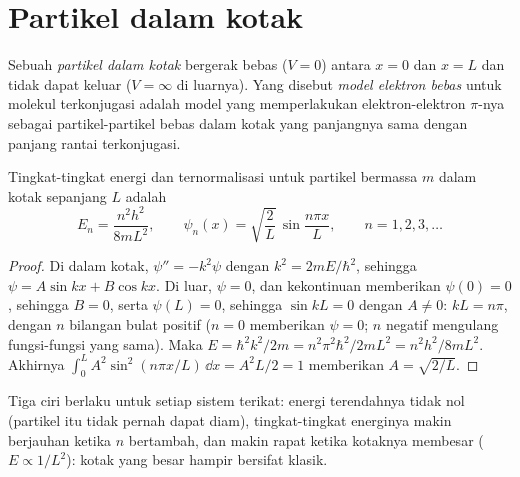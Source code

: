 \section{Partikel dalam kotak}

\begin{definition}\label{def:b3:quantum-model-systems:box}
Sebuah \emph{partikel dalam kotak} bergerak
bebas ($V = 0$) antara $x = 0$ dan $x = L$ dan tidak dapat keluar
($V = \infty$ di luarnya). Yang disebut \emph{model elektron
bebas} untuk molekul terkonjugasi adalah model
yang memperlakukan elektron-elektron $\pi$-nya sebagai partikel-partikel
bebas dalam kotak yang panjangnya sama dengan panjang rantai terkonjugasi.
\end{definition}

\begin{theorem}\label{thm:b3:quantum-model-systems:box}
Tingkat-tingkat energi dan  ternormalisasi untuk
partikel bermassa $m$ dalam kotak sepanjang $L$ adalah
\[
E_n = \frac{n^2h^2}{8mL^2}, \qquad \psi_n(x) = \sqrt{\frac2L}\,\sin\frac{n\pi
x}{L}, \qquad n = 1, 2, 3, \dots
\]
\end{theorem}

\begin{proof}
Di dalam kotak, $\psi'' = -k^2\psi$ dengan $k^2 = 2mE/\hbar^2$, sehingga
$\psi = A\sin kx +
B\cos kx$. Di luar, $\psi = 0$, dan kekontinuan memberikan
$\psi(0) = 0$, sehingga $B =
0$, serta $\psi(L) = 0$, sehingga $\sin kL = 0$
dengan $A \ne 0$: $kL = n\pi$, dengan $n$ bilangan bulat positif ($n = 0$
memberikan $\psi = 0$; $n$ negatif mengulang fungsi-fungsi yang sama). Maka
$E = \hbar^2k^2/2m = n^2\pi^2\hbar^2/2mL^2 = n^2h^2/8mL^2$. Akhirnya
$\int_0^L A^2\sin^2(n\pi x/L)\,\dd x = A^2L/2 = 1$ memberikan $A =
\sqrt{2/L}$.
\end{proof}

Tiga ciri berlaku untuk setiap sistem terikat: energi terendahnya tidak nol
(partikel itu tidak pernah dapat diam), tingkat-tingkat energinya makin
berjauhan ketika $n$ bertambah, dan makin rapat ketika kotaknya membesar
($E \propto 1/L^2$): kotak yang besar hampir bersifat klasik.

